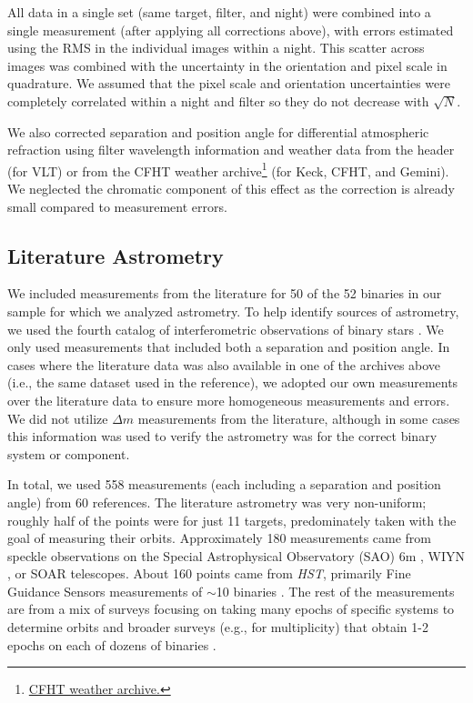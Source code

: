 \documentclass[twocolumn]{aastex62}
\begin{document}
All data in a single set (same target, filter, and night) were combined into a single measurement (after applying all corrections above), with errors estimated using the RMS in the individual images within a night. This scatter across images was combined with the uncertainty in the orientation and pixel scale in quadrature. We assumed that the pixel scale and orientation uncertainties were completely correlated within a night and filter so they do not decrease with $\sqrt{N}$. 

We also corrected separation and position angle for differential atmospheric refraction \citep{2010SPIE.7736E..1IL} using filter wavelength information and weather data from the header (for VLT) or from the CFHT weather archive\footnote{\href{http://mkwc.ifa.hawaii.edu/archive/wx/cfht/}{CFHT weather archive.}} (for Keck, CFHT, and Gemini). We neglected the chromatic component of this effect as the correction is already small compared to measurement errors. 


\subsection{Literature Astrometry}\label{sec:litas}

We included  measurements from the literature for 50 of the 52 binaries in our sample for which we analyzed astrometry. To help identify sources of astrometry, we used the fourth catalog of interferometric observations of binary stars \citep[INT4,][]{Hartkopf:2001}. We only used measurements that included both a separation and position angle. In cases where the literature data was also available in one of the archives above (i.e., the same dataset used in the reference), we adopted our own measurements over the literature data to ensure more homogeneous measurements and errors. We did not utilize $\Delta m$ measurements from the literature, although in some cases this information was used to verify the astrometry was for the correct binary system or component.  

In total, we used 558 measurements (each including a separation and position angle) from 60 references. The literature astrometry was very non-uniform; roughly half of the points were for just 11 targets, predominately taken with the goal of measuring their orbits. Approximately 180 measurements came from speckle observations on the Special Astrophysical Observatory (SAO) 6m \citep[e.g.,][]{Bag2002}, WIYN \citep[e.g.,][]{Hor2017}, or SOAR \citep[][]{Tok2017b} telescopes. About 160 points came from {\it HST}, primarily Fine Guidance Sensors measurements  of $\sim$10 binaries \citep[e.g.,][]{Benedict2016}. The rest of the measurements are from a mix of surveys focusing on taking many epochs of specific systems to determine orbits \citep[e.g.,][]{Koh2012} and broader surveys (e.g., for multiplicity) that obtain 1-2 epochs on each of dozens of binaries \citep[e.g.,][]{Janson2012}.  
\end{document}
